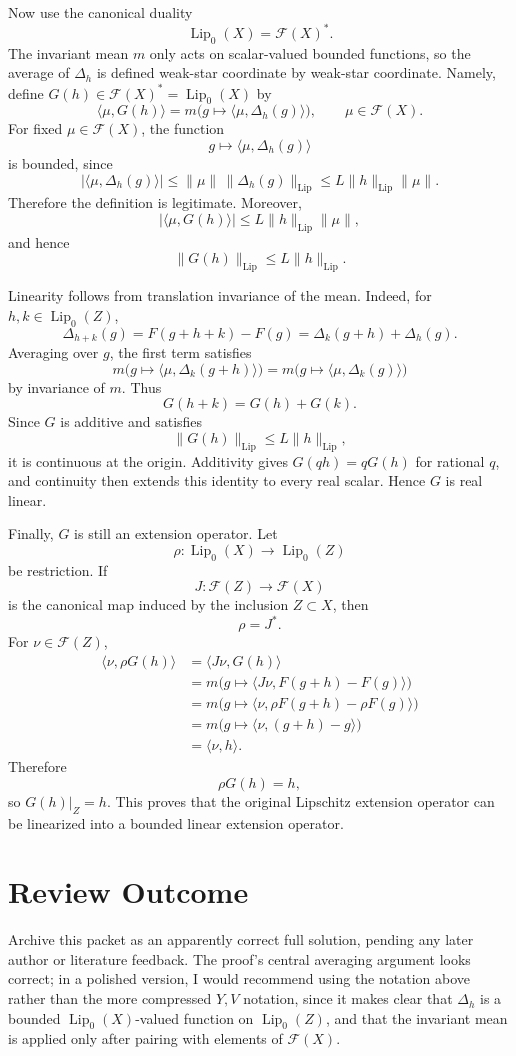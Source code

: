 ﻿\documentclass[11pt]{article}
\newcommand{\Lipz}{\operatorname{Lip}_0}
\newcommand{\Lip}{\operatorname{Lip}}
\newcommand{\FF}{\mathcal F}
\begin{document}
Now use the canonical duality
\[
  \Lipz(X)=\FF(X)^*.
\]
The invariant mean \(m\) only acts on scalar-valued bounded functions, so the average of \(\Delta_h\) is defined weak-star coordinate by weak-star coordinate. Namely, define \(G(h)\in\FF(X)^*=\Lipz(X)\) by
\[
  \langle \mu,G(h)\rangle
  =
  m\bigl(g\mapsto \langle \mu,\Delta_h(g)\rangle\bigr),
  \qquad \mu\in\FF(X).
\]
For fixed \(\mu\in\FF(X)\), the function
\[
  g\mapsto \langle \mu,\Delta_h(g)\rangle
\]
is bounded, since
\[
  |\langle \mu,\Delta_h(g)\rangle|
  \leq \|\mu\|\,\|\Delta_h(g)\|_{\Lip}
  \leq L\|h\|_{\Lip}\|\mu\|.
\]
Therefore the definition is legitimate. Moreover,
\[
  |\langle \mu,G(h)\rangle|
  \leq L\|h\|_{\Lip}\|\mu\|,
\]
and hence
\[
  \|G(h)\|_{\Lip}\leq L\|h\|_{\Lip}.
\]

Linearity follows from translation invariance of the mean. Indeed, for \(h,k\in\Lipz(Z)\),
\[
  \Delta_{h+k}(g)
  =F(g+h+k)-F(g)
  =\Delta_k(g+h)+\Delta_h(g).
\]
Averaging over \(g\), the first term satisfies
\[
  m\bigl(g\mapsto \langle\mu,\Delta_k(g+h)\rangle\bigr)
  =m\bigl(g\mapsto \langle\mu,\Delta_k(g)\rangle\bigr)
\]
by invariance of \(m\). Thus
\[
  G(h+k)=G(h)+G(k).
\]
Since \(G\) is additive and satisfies
\[
  \|G(h)\|_{\Lip}\leq L\|h\|_{\Lip},
\]
it is continuous at the origin. Additivity gives \(G(qh)=qG(h)\) for rational
\(q\), and continuity then extends this identity to every real scalar. Hence
\(G\) is real linear.

Finally, \(G\) is still an extension operator. Let
\[
  \rho:\Lipz(X)\longrightarrow\Lipz(Z)
\]
be restriction. If
\[
  J:\FF(Z)\longrightarrow\FF(X)
\]
is the canonical map induced by the inclusion \(Z\subset X\), then
\[
  \rho=J^*.
\]
For \(\nu\in\FF(Z)\),
\begin{align*}
  \langle \nu,\rho G(h)\rangle
  &=\langle J\nu,G(h)\rangle \\
  &=m\bigl(g\mapsto \langle J\nu,F(g+h)-F(g)\rangle\bigr)\\
  &=m\bigl(g\mapsto \langle \nu,\rho F(g+h)-\rho F(g)\rangle\bigr)\\
  &=m\bigl(g\mapsto \langle \nu,(g+h)-g\rangle\bigr)\\
  &=\langle \nu,h\rangle.
\end{align*}
Therefore
\[
  \rho G(h)=h,
\]
so \(G(h)|_Z=h\). This proves that the original Lipschitz extension operator can be linearized into a bounded linear extension operator.

\section*{Review Outcome}

Archive this packet as an apparently correct full solution, pending any later author or literature feedback. The proof's central averaging argument looks correct; in a polished version, I would recommend using the notation above rather than the more compressed \(Y,V\) notation, since it makes clear that \(\Delta_h\) is a bounded \(\Lipz(X)\)-valued function on \(\Lipz(Z)\), and that the invariant mean is applied only after pairing with elements of \(\FF(X)\).
\end{document}
